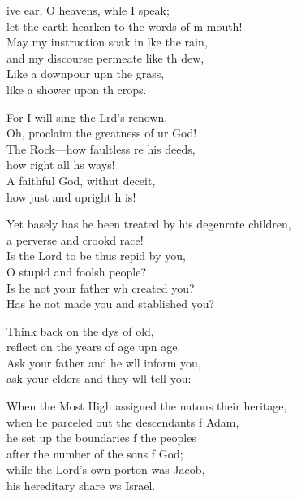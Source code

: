 \settowidth{\versewidth}{Yet basely has he been treated by his degenerate children, *}
\begin{psalmverse}%
  \begin{patverse}
ive ear, O heavens, wh\pointup{\i}le I speak;\Med\\
let the earth hearken to the words of m mouth!\\
May my instruction soak in l\pointup{\i}ke the rain,\Med\\
and my discourse permeate like th dew,\\
Like a downpour upn the grass,\Med\\
like a shower upon th crops.

For I will sing the Lrd’s renown.\Med\\
Oh, proclaim the greatness of ur God!\\
The Rock---how faultless re his deeds,\Med\\
how right all h\pointup{\i}s ways!\\
A faithful God, withut deceit,\Med\\
how just and upright h is!

Yet basely has he been treated by his degenrate children,\Med\\
a perverse and crookd race!\\
Is the Lord to be thus repid by you,\Med\\
O stupid and fool\pointup{\i}sh people?\\
Is he not your father wh created you?\Med\\
Has he not made you and stablished you?

Think back on the dys of old,\Med\\
reflect on the years of age upn age.\\
Ask your father and he w\pointup{\i}ll inform you,\Med\\
ask your elders and they w\pointup{\i}ll tell you:

When the Most High assigned the nat\pointup{\i}ons their heritage,\Med\\
when he parceled out the descendants f Adam,\\
he set up the boundaries f the peoples\Med\\
after the number of the sons f God;\\
while the Lord’s own port\pointup{\i}on was Jacob,\Med\\
his hereditary share ws Israel.


\end{patverse}
\end{psalmverse}
